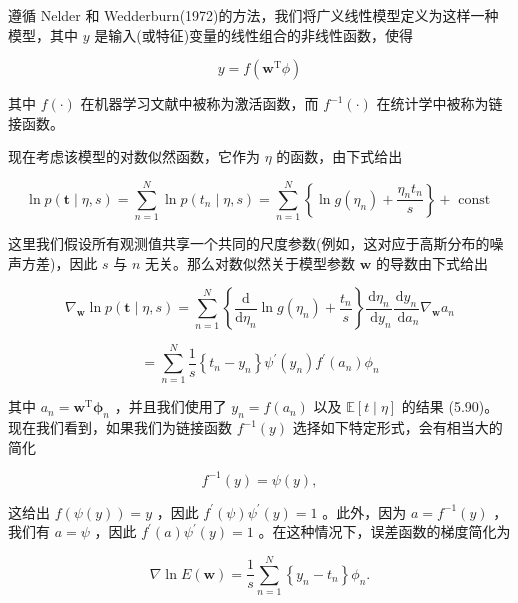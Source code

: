 \documentclass[10pt]{report}
\begin{document}
遵循 Nelder 和 Wedderburn(1972)的方法，我们将广义线性模型定义为这样一种模型，其中 \(y\) 是输入(或特征)变量的线性组合的非线性函数，使得

\[
y = f\left( {{\mathbf{w}}^{\mathrm{T}}\phi }\right)  \tag{5.91}
\]

其中 \(f\left( \cdot \right)\) 在机器学习文献中被称为激活函数，而 \({f}^{-1}\left( \cdot \right)\) 在统计学中被称为链接函数。

现在考虑该模型的对数似然函数，它作为 \(\eta\) 的函数，由下式给出

\[
\ln p\left( {\mathbf{t} \mid  \eta ,s}\right)  = \mathop{\sum }\limits_{{n = 1}}^{N}\ln p\left( {{t}_{n} \mid  \eta ,s}\right)  = \mathop{\sum }\limits_{{n = 1}}^{N}\left\{  {\ln g\left( {\eta }_{n}\right)  + \frac{{\eta }_{n}{t}_{n}}{s}}\right\}   + \text{ const } \tag{5.92}
\]

这里我们假设所有观测值共享一个共同的尺度参数(例如，这对应于高斯分布的噪声方差)，因此 \(s\) 与 \(n\) 无关。那么对数似然关于模型参数 \(\mathbf{w}\) 的导数由下式给出

\[
{\nabla }_{\mathbf{w}}\ln p\left( {\mathbf{t} \mid  \eta ,s}\right)  = \mathop{\sum }\limits_{{n = 1}}^{N}\left\{  {\frac{\mathrm{d}}{\mathrm{d}{\eta }_{n}}\ln g\left( {\eta }_{n}\right)  + \frac{{t}_{n}}{s}}\right\}  \frac{\mathrm{d}{\eta }_{n}}{\mathrm{\;d}{y}_{n}}\frac{\mathrm{d}{y}_{n}}{\mathrm{\;d}{a}_{n}}{\nabla }_{\mathbf{w}}{a}_{n}
\]

\[
= \mathop{\sum }\limits_{{n = 1}}^{N}\frac{1}{s}\left\{  {{t}_{n} - {y}_{n}}\right\}  {\psi }^{\prime }\left( {y}_{n}\right) {f}^{\prime }\left( {a}_{n}\right) {\phi }_{n} \tag{5.93}
\]

其中 \({a}_{n} = {\mathbf{w}}^{\mathrm{T}}{\mathbf{\phi }}_{n}\) ，并且我们使用了 \({y}_{n} = f\left( {a}_{n}\right)\) 以及 \(\mathbb{E}\left\lbrack  {t \mid  \eta }\right\rbrack\) 的结果 (5.90)。现在我们看到，如果我们为链接函数 \({f}^{-1}\left( y\right)\) 选择如下特定形式，会有相当大的简化

\[
{f}^{-1}\left( y\right)  = \psi \left( y\right) , \tag{5.94}
\]

这给出 \(f\left( {\psi \left( y\right) }\right)  = y\) ，因此 \({f}^{\prime }\left( \psi \right) {\psi }^{\prime }\left( y\right)  = 1\) 。此外，因为 \(a = {f}^{-1}\left( y\right)\) ，我们有 \(a = \psi\) ，因此 \({f}^{\prime }\left( a\right) {\psi }^{\prime }\left( y\right)  = 1\) 。在这种情况下，误差函数的梯度简化为

\[
\nabla \ln E\left( \mathbf{w}\right)  = \frac{1}{s}\mathop{\sum }\limits_{{n = 1}}^{N}\left\{  {{y}_{n} - {t}_{n}}\right\}  {\phi }_{n}. \tag{5.95}
\]
\end{document}
